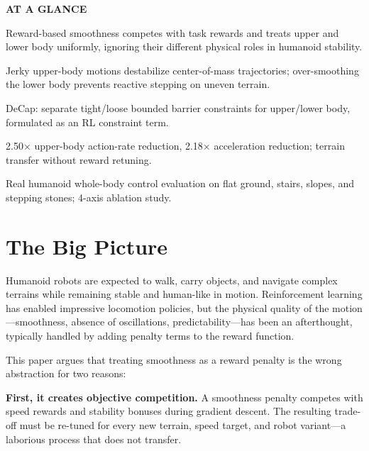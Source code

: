 \documentclass[10pt,twocolumn]{article}
\begin{document}
\begin{mdframed}[backgroundcolor=boxgray,linecolor=rulered,linewidth=1pt,
    innerleftmargin=6pt,innerrightmargin=6pt,
    innertopmargin=6pt,innerbottommargin=6pt]
\textbf{\small AT A GLANCE}\par\vspace{4pt}
\begin{description}[leftmargin=0pt,labelsep=4pt,itemsep=2pt,parsep=0pt,
    font=\small\bfseries]
  \item[Problem:] Reward-based smoothness competes with task rewards
    and treats upper and lower body uniformly, ignoring their different
    physical roles in humanoid stability.
  \item[Why it matters:] Jerky upper-body motions destabilize center-of-mass
    trajectories; over-smoothing the lower body prevents reactive stepping
    on uneven terrain.
  \item[Method:] DeCap: separate tight/loose bounded barrier constraints
    for upper/lower body, formulated as an RL constraint term.
  \item[Result:] 2.50$\times$ upper-body action-rate reduction,
    2.18$\times$ acceleration reduction; terrain transfer without reward
    retuning.
  \item[Evidence:] Real humanoid whole-body control evaluation on flat
    ground, stairs, slopes, and stepping stones; 4-axis ablation study.
\end{description}
\end{mdframed}

\section{The Big Picture}

Humanoid robots are expected to walk, carry objects, and navigate
complex terrains while remaining stable and human-like in motion.
Reinforcement learning has enabled impressive locomotion policies,
but the physical quality of the motion---smoothness, absence of
oscillations, predictability---has been an afterthought, typically
handled by adding penalty terms to the reward function.

This paper argues that treating smoothness as a reward penalty is
the wrong abstraction for two reasons:

\textbf{First, it creates objective competition.} A smoothness penalty
competes with speed rewards and stability bonuses during gradient descent.
The resulting trade-off must be re-tuned for every new terrain, speed
target, and robot variant---a laborious process that does not transfer.
\end{document}
